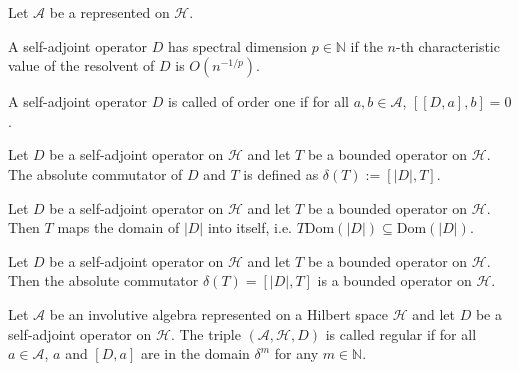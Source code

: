 \begin{definition}\label{def:representation-of-algebra}
    Let $\mathcal{A}$ be a represented on $\mathcal{H}$.
\end{definition}

\begin{definition}\label{def:spectral-dimension}
    A self-adjoint operator $D$ has spectral dimension $p \in \mathbb{N}$ if the $n$-th characteristic value of the resolvent of $D$ is  $O(n^{-1/p})$.
\end{definition}

\begin{definition}\label{def:order-one}
    A self-adjoint operator $D$ is called of order one if for all $a,b \in \mathcal{A}$, $[[D,a],b] = 0$.
\end{definition}

\begin{definition}\label{def:absolute-commutator}
    Let $D$ be a self-adjoint operator on $\mathcal{H}$ and let $T$ be a bounded operator on $\mathcal{H}$. The absolute commutator of $D$ and $T$ is defined as $\delta(T):=[|D|,T]$.
\end{definition}

\begin{lemma}\label{lem:domain-of-bounded-operators}
    Let $D$ be a self-adjoint operator on $\mathcal{H}$ and let $T$ be a bounded operator on $\mathcal{H}$. Then $T$ maps the domain of $|D|$ into itself, i.e. $T \textrm{Dom}(|D|) \subseteq \textrm{Dom}(|D|)$.
\end{lemma}

\begin{lemma}\label{lem:boundedness-of-absolute-commutator}
    Let $D$ be a self-adjoint operator on $\mathcal{H}$ and let $T$ be a bounded operator on $\mathcal{H}$. Then the absolute commutator $\delta(T) = [|D|,T]$ is a bounded operator on $\mathcal{H}$.
\end{lemma}

\begin{definition} \label{def:spectral-regularity}
    Let $\mathcal{A}$ be an involutive algebra represented on a Hilbert space $\mathcal{H}$ and let $D$ be a self-adjoint operator on $\mathcal{H}$. The triple $(\mathcal{A}, \mathcal{H}, D)$ is called regular if for all $a \in \mathcal{A}$, $a$ and $[D,a]$ are in the domain $\delta^m$ for any $m \in \mathbb{N}$. 
\end{definition}

